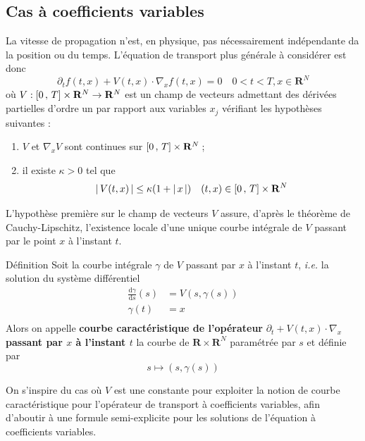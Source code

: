     \subsection{Cas à coefficients variables}

        La vitesse de propagation n’est, en physique, pas nécessairement indépendante da la position ou du temps. L’équation de transport plus générale à considérer est donc 
        \[ \partial_t f(t,x) + V(t,x) \cdot \nabla_x f(t,x) = 0 \quad 0 < t < T, x \in \mathbf{R}^N \]   
        où $V : \left[ 0 \, , \, T \right] \times \mathbf{R}^N \to \mathbf{R}^N$ est un champ de vecteurs admettant des dérivées partielles d’ordre un par rapport aux variables $x_j$ vérifiant les hypothèses suivantes : 
        \begin{enumerate}[label=($h_{\arabic*}$)]
            \item $V$ et $\nabla_x V$ sont continues sur $\left[ 0 \, , \, T \right] \times \mathbf{R}^N$ ;
            \item il existe $\kappa > 0$ tel que 
            \[ \left\lvert \, V(t,x) \, \right\rvert \leq \kappa(1 + \left\lvert \, x \, \right\rvert) \quad (t,x) \in \left[ 0 \, , \, T \right] \times \mathbf{R}^N  \]
        \end{enumerate}

        L’hypothèse première sur le champ de vecteurs $V$ assure, d’après le théorème de Cauchy-Lipschitz, l’existence locale d’une unique courbe intégrale de $V$ passant par le point $x$ à l’instant $t$.

        \begin{omed}{Définition}
            Soit la courbe intégrale $\gamma$ de $V$ passant par $x$ à l’instant $t$, \textit{i.e.} la solution du système différentiel 
            \begin{align*}
                \frac{\text{d}\gamma}{\text{d}s} (s) &= V(s, \gamma(s)) \\
                \gamma(t) &= x \\
            \end{align*}
            Alors on appelle \textbf{courbe caractéristique de l’opérateur} $\partial_t + V(t,x) \cdot \nabla_x$ \textbf{passant par $x$ à l’instant $t$} la courbe de $\mathbf{R} \times \mathbf{R}^N$ paramétrée par $s$ et définie par 
            \[ s \mapsto (s, \gamma(s)) \]   
        \end{omed}

        On s’inspire du cas où $V$ est une constante pour exploiter la notion de courbe caractéristique pour l’opérateur de transport à coefficients variables, afin d’aboutir à une formule semi-explicite pour les solutions de l’équation à coefficients variables.

